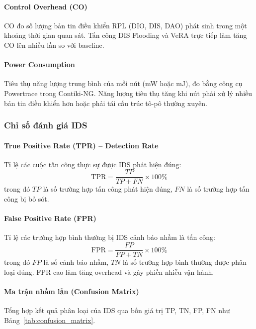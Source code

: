 \paragraph{Control Overhead (CO)}
CO đo số lượng bản tin điều khiển RPL (DIO, DIS, DAO) phát sinh trong
một khoảng thời gian quan sát. Tấn công DIS Flooding và VeRA trực tiếp
làm tăng CO lên nhiều lần so với baseline.

\paragraph{Power Consumption}
Tiêu thụ năng lượng trung bình của mỗi nút (mW hoặc mJ), đo bằng công
cụ Powertrace trong Contiki-NG. Năng lượng tiêu thụ tăng khi nút phải
xử lý nhiều bản tin điều khiển hơn hoặc phải tái cấu trúc tô-pô thường
xuyên.

\subsubsection{Chỉ số đánh giá IDS}

\paragraph{True Positive Rate (TPR) -- Detection Rate}
Tỉ lệ các cuộc tấn công thực sự được IDS phát hiện đúng:
\begin{equation}
    \text{TPR} = \frac{TP}{TP + FN} \times 100\%
    \label{eq:tpr}
\end{equation}
trong đó $TP$ là số trường hợp tấn công phát hiện đúng, $FN$ là số
trường hợp tấn công bị bỏ sót.

\paragraph{False Positive Rate (FPR)}
Tỉ lệ các trường hợp bình thường bị IDS cảnh báo nhầm là tấn công:
\begin{equation}
    \text{FPR} = \frac{FP}{FP + TN} \times 100\%
    \label{eq:fpr}
\end{equation}
trong đó $FP$ là số cảnh báo nhầm, $TN$ là số trường hợp bình thường
được phân loại đúng. FPR cao làm tăng overhead và gây phiền nhiễu vận
hành.

\paragraph{Ma trận nhầm lẫn (Confusion Matrix)}
Tổng hợp kết quả phân loại của IDS qua bốn giá trị TP, TN, FP, FN như
Bảng~\ref{tab:confusion_matrix}.

